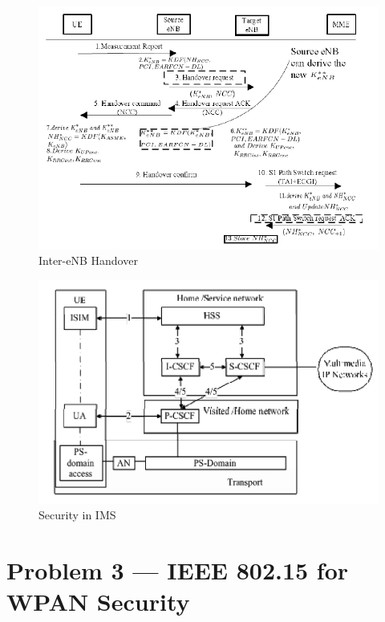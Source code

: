 \documentclass[a4paper]{report}
\begin{document}
\begin{figure}
\begin{mdframed}
\includegraphics[scale=0.45]{Inter_eNB_Handover.png}
\caption{Inter-eNB Handover}
\label{fig:prob2c}
\end{mdframed}
\end{figure}

\begin{figure}
\begin{mdframed}
\includegraphics[scale=0.45]{IMS_Security.png}
\caption{Security in IMS}
\label{fig:prob2d}
\end{mdframed}
\end{figure}

\section{Problem 3 --- IEEE 802.15 for WPAN Security}
\end{document}
